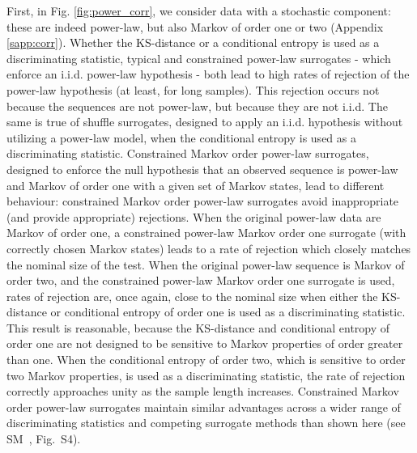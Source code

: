 \documentclass[%
prx,
reprint,
superscriptaddress,
nofootinbib,
 amsmath,amssymb,
 aps,
floatfix,
]{revtex4-2}
\begin{document}
First, in Fig. \ref{fig:power_corr}, we consider data with a stochastic component: these are indeed power-law, but also Markov of order one or two (Appendix \ref{sapp:corr}). Whether the KS-distance or a conditional entropy is used as a discriminating statistic, typical and constrained power-law surrogates - which enforce an i.i.d. power-law hypothesis - both lead to high rates of rejection of the power-law hypothesis (at least, for long samples). This rejection occurs not because the sequences are not power-law, but because they are not i.i.d. The same is true of shuffle surrogates, designed to apply an i.i.d. hypothesis without utilizing a power-law model, when the conditional entropy is used as a discriminating statistic. Constrained Markov order power-law surrogates, designed to enforce the null hypothesis that an observed sequence is power-law and Markov of order one with a given set of Markov states, lead to different behaviour: constrained Markov order power-law surrogates avoid inappropriate (and provide appropriate) rejections. When the original power-law data are Markov of order one, a constrained power-law Markov order one surrogate (with correctly chosen Markov states) leads to a rate of rejection which closely matches the nominal size of the test. When the original power-law sequence is Markov of order two, and the constrained power-law Markov order one surrogate is used, rates of rejection are, once again, close to the nominal size when either the KS-distance or conditional entropy of order one is used as a discriminating statistic. This result is reasonable, because the KS-distance and conditional entropy of order one are not designed to be sensitive to Markov properties of order greater than one. When the conditional entropy of order two, which is sensitive to order two Markov properties, is used as a discriminating statistic, the rate of rejection correctly approaches unity as the sample length increases. Constrained Markov order power-law surrogates maintain similar advantages across a wider range of discriminating statistics and competing surrogate methods than shown here (see SM~\cite{supplemental}, {Fig.~S4}).
\end{document}
